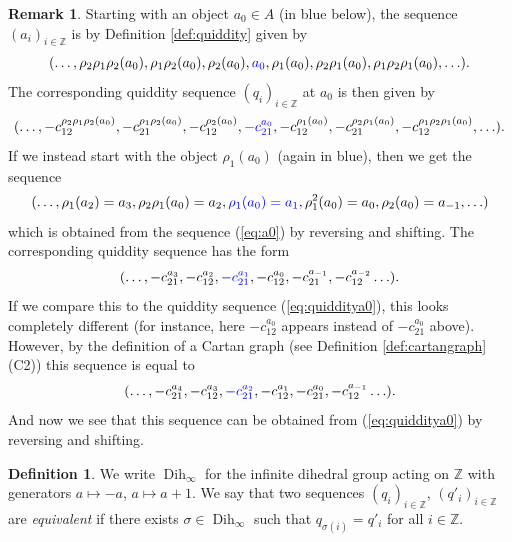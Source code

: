 \documentclass[11pt,a4paper]{amsart}
\theoremstyle{definition}
\newtheorem{Definition}[Lemma]{Definition}
\newtheorem{Remark}[Lemma]{Remark}
\numberwithin{equation}{section}
\DeclareMathOperator{\Dih}{Dih}
\begin{document}
\begin{Remark} \label{rem:a0a1}
Starting with an object $a_0\in A$ (in blue below), the sequence 
$(a_i)_{i\in \mathbb{Z}}$ is by Definition
\ref{def:quiddity}
given by
\begin{equation} \label{eq:a0}
(\ldots, \rho_2\rho_1\rho_2(a_0),\rho_1\rho_2(a_0),\rho_2(a_0),{\color{blue} a_0},\rho_1(a_0), \rho_2\rho_1(a_0), 
\rho_1\rho_2\rho_1(a_0),\ldots).
\end{equation}
The corresponding quiddity sequence 
$(q_i)_{i\in \mathbb{Z}}$ at $a_0$ is then 
given by 
\begin{equation} \label{eq:quidditya0}
    (\ldots, -c_{12}^{\rho_2\rho_1\rho_2(a_0)},-c_{21}^{\rho_1\rho_2(a_0)},-c_{12}^{\rho_2(a_0)},
    {\color{blue} -c_{21}^{a_0}}, -c_{12}^{\rho_1(a_0)}, -c_{21}^{\rho_2\rho_1(a_0)}, 
-c_{12}^{\rho_1\rho_2\rho_1(a_0)},\ldots).
\end{equation}
If we instead start with the object $\rho_1(a_0)$
(again in blue), then we get the sequence
$$(\ldots,\rho_1(a_2)=a_3,\rho_2\rho_1(a_0)=a_2,{\color{blue} \rho_1(a_0)=a_1},\rho_1^2(a_0)=a_0, \rho_2(a_0)=a_{-1},\ldots)
$$
which is obtained from the sequence (\ref{eq:a0})
by reversing and shifting.
The corresponding quiddity sequence has the form
$$(\ldots,-c_{21}^{a_3},-c_{12}^{a_2},
{\color{blue} -c_{21}^{a_1}},-c_{12}^{a_0}, 
-c_{21}^{a_{-1}},-c_{12}^{a_{-2}}\ldots). 
$$
If we compare this to the quiddity sequence
(\ref{eq:quidditya0}), this looks completely 
different (for instance, here $-c_{12}^{a_0}$
appears instead of $-c_{21}^{a_0}$ above). 
However, by the definition of a Cartan graph (see
Definition \ref{def:cartangraph}\,(C2)) this sequence 
is equal to
$$(\ldots,-c_{21}^{a_4},-c_{12}^{a_3},
{\color{blue} -c_{21}^{a_2}},-c_{12}^{a_1}, 
-c_{21}^{a_{0}},-c_{12}^{a_{-1}}\ldots). 
$$
And now we see that this sequence can be obtained
from (\ref{eq:quidditya0}) by reversing and shifting.
\end{Remark}





\begin{Definition} \label{def:infinitedihedral}
We write $\Dih_\infty$ 
for the infinite dihedral group acting on $\mathbb{Z}$ with generators $a\mapsto -a$, $a \mapsto a+1$. We say that two sequences
$(q_i)_{i\in\mathbb{Z}}$, $(q'_i)_{i\in\mathbb{Z}}$ are \emph{equivalent} if there exists
$\sigma\in\Dih_\infty$ such that $q_{\sigma(i)} = q'_{i}$ for all $i\in\mathbb{Z}$.
\end{Definition}
\end{document}
